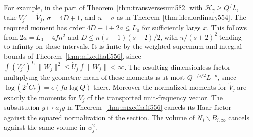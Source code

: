 \documentclass[a4paper,11pt]{article}
\theoremstyle{definition}
\theoremstyle{remark}
\numberwithin{equation}{section}
\begin{document}
For example, in the part of
Theorem~\ref{thm:transversesum582} with
\(\mathcal H_\gamma\ge Q^fL\), take \(V_j'=\widetilde V_j\),
\(\sigma=4D+1\), and \(u=a\) as in
Theorem~\ref{thm:idealordinary554}. The required moment has
order \(4D+1+2a\le L_0\) for sufficiently large \(x\).
This follows from \(2a=L_0-4fn^2\) and \(D\le n(s+1)(s+2)/2\),
with \(n/(s+2)^2\) tending to infinity on these intervals.
It is finite by the weighted supremum and integral bounds
of Theorem~\ref{thm:mixedhalf556}, since
\(\int(V_j')^{L_0}\|W_j\|^2
 \le\widetilde U_j\int\|W_j\|<\infty\).
The resulting dimensionless factor multiplying the geometric
mean of these moments is at most \(Q^{-fa/2}L^{-a}\), since
\(\log(2^fC_*)=o(fa\log Q)\) there. Moreover the
normalized moments for \(\widetilde V_j\) are exactly the
moments for \(V_j\) of the transported unit-frequency vector.
The substitution \(y\mapsto a_jy\) in
Theorem~\ref{thm:mixedhalf556} cancels its Haar factor
against the squared normalization of the section. The
volume of \(N_j\backslash B_{j,\infty}\) cancels against
the same volume in \(w_j^2\).
\end{document}

